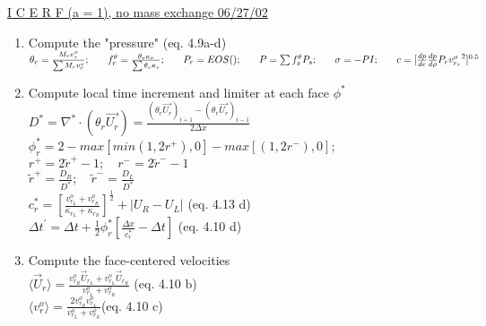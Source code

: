\documentclass[fleqn]{article}
\newcommand{\delt}          {\ensuremath{\Delta{t}} }
\newcommand{\delx}          {\ensuremath{\Delta{x}} }
\newcommand{\f}             {\ensuremath{f^{\theta}_r} }
\newcommand{\sv}[1]         {\ensuremath{v^o_{r_{#1}} }}
\begin{document}
\setlength{\abovedisplayskip}{0.01in}
\setlength{\abovedisplayshortskip}{0.01in}
\setlength{\belowdisplayskip}{0.01in}
\setlength{\belowdisplayshortskip}{0.01in}
\setlength{\topsep}{0.01in}
\setlength{\mathindent}{0.01in}
\underline{I C E R F \quad  (a = 1), no mass exchange \hspace{ 0.5in}06/27/02}

\begin{enumerate}
\item Compute the "pressure"  (eq. 4.9a-d)\\
  $
    \theta_r = \frac{M_r \sv{} }{\sum{M_r \sv{} }}; \hspace{0.25in}
    \f = \frac{\theta_r \kappa_r}{\sum{\theta_s \kappa_s}};\hspace{0.25in}
    P_r = EOS(); \hspace{0.25in}
    P = \sum{f^{\theta}_s P_s}; \hspace{0.25in}
    \sigma = -PI; \hspace{0.25in}
    c = [\frac{dp}{de}\frac{dp}{d\rho} P_r {\sv{r}}^2]^{0.5}
  $
\item Compute local time increment and limiter at each face $\phi^*$\\
   $D^* = \nabla^* \cdot { (\theta_r \vec{U_r} )} = \frac{ (\theta_r\vec{U_r})_{i+1} - (\theta_r\vec{U_r})_{i-1}}{2\delx}$  \\
   $\phi^*_r = 2 - max[min(1,2r^+),0]-max[(1,2r^-),0];$ \\
   $ r^+ = 2 \tilde r^{+} - 1;   \quad r^- = 2 \tilde r^{-} - 1$\\
   $ \tilde r^{+} = \frac{D_R}{D^*}; \quad  \tilde r^{-} = \frac{D_L}{D^*}$\\
   $ c^*_r 
   = [\frac{ \sv{L} + \sv{R} }{\kappa_{r_L} + \kappa_{r_R}}]^{\frac{1}{2}} 
   + | U_R - U_L| $   \hspace{0.5in}(eq. 4.13 d)\\
   $ \delt^\prime = \delt + 
                        \frac{1}{2} \phi^*_r [\frac{\delx}{c^*_r} -
                        \delt ]$  \hspace{0.5in}(eq. 4.10 d)
\item Compute the face-centered velocities \\
  $ \langle \vec{U}_r \rangle = 
          \frac{ \sv{R} \vec{U}_{r_L} + \sv{L} \vec{U}_{r_R}}{\sv{L} + \sv{R}}$ \hspace{0.5in}(eq. 4.10 b)\\
  $ \langle \sv{} \rangle = \frac{ 2\sv{R} \sv{L} }{ \sv{L} + \sv{R} }$\hspace{0.5in}(eq. 4.10 c)\\

\end{enumerate}
\end{document}
